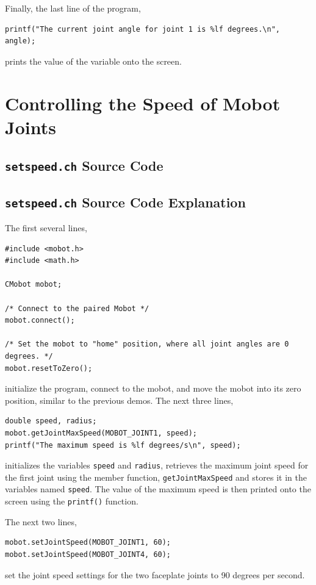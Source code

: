 \documentclass{article}
\begin{document}
Finally, the last line of the program,
\begin{verbatim}
printf("The current joint angle for joint 1 is %lf degrees.\n", angle);
\end{verbatim}
prints the value of the variable onto the screen. 


\section{Controlling the Speed of Mobot Joints}
\subsection{\texttt{setspeed.ch} Source Code}

\subsection{\texttt{setspeed.ch} Source Code Explanation}
The first several lines,
\begin{verbatim}
#include <mobot.h>
#include <math.h>

CMobot mobot;

/* Connect to the paired Mobot */
mobot.connect();

/* Set the mobot to "home" position, where all joint angles are 0 degrees. */
mobot.resetToZero();
\end{verbatim}
initialize the program, connect to the mobot, and move the mobot into its zero position,
similar to the previous demos. The next three lines,
\begin{verbatim}
double speed, radius;
mobot.getJointMaxSpeed(MOBOT_JOINT1, speed);
printf("The maximum speed is %lf degrees/s\n", speed);
\end{verbatim}
initializes the variables \texttt{speed} and \texttt{radius},
retrieves the maximum joint speed for the first joint using the member function,
\texttt{getJointMaxSpeed} and stores it in the variables named \texttt{speed}.
The value of the maximum speed is then printed onto the screen using the \texttt{printf()}
function.

The next two lines,
\begin{verbatim}
mobot.setJointSpeed(MOBOT_JOINT1, 60);
mobot.setJointSpeed(MOBOT_JOINT4, 60);
\end{verbatim}
set the joint speed settings for the two faceplate joints to 90 degrees per second.
\end{document}
